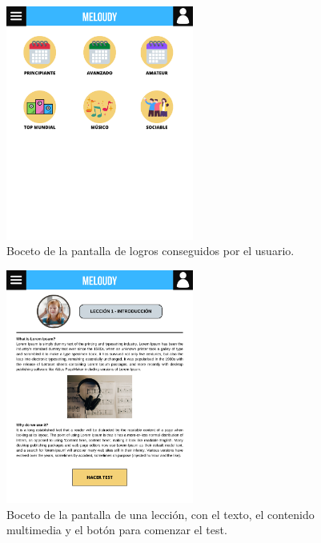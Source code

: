 \begin{figure}[H]
    \centering
    \centerline{\includegraphics[width=0.55\textwidth, frame]{imagenes/c6/3.png}}
    \caption{Boceto de la pantalla de logros conseguidos por el usuario.}
    \label{fig:logros}
\end{figure}


\begin{figure}[H]
    \centering
    \centerline{\includegraphics[width=0.55\textwidth, frame]{imagenes/c6/4.png}}
    \caption{Boceto de la pantalla de una lección, con el texto, el contenido multimedia y el botón para comenzar el test.}
    \label{fig:leccion}
\end{figure}

